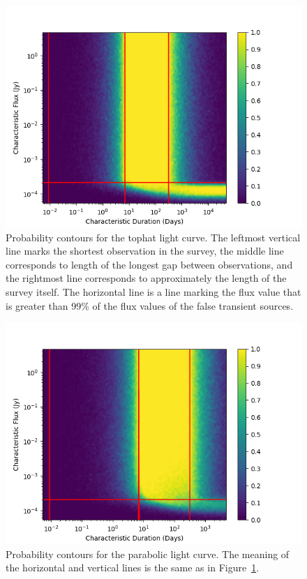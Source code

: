 \documentclass[12pt]{article}
\begin{document}
 \begin{figure}
\includegraphics[width=\columnwidth]{tophat.png}
\caption{Probability contours for the tophat light curve. The leftmost vertical line marks the shortest observation in the survey, the middle line corresponds to length of the longest gap between observations, and the rightmost line corresponds to approximately the length of the survey itself. The horizontal line is a line marking the flux value that is greater than 99\% of the flux values of the false transient sources.}
\label{tophat}
 \end{figure} \begin{figure}
\includegraphics[width=\columnwidth]{parabolic.png}
\caption{Probability contours for the parabolic light curve. The meaning of the horizontal and vertical lines is the same as in Figure~\ref{tophat}.}

\end{figure}
\end{document}

